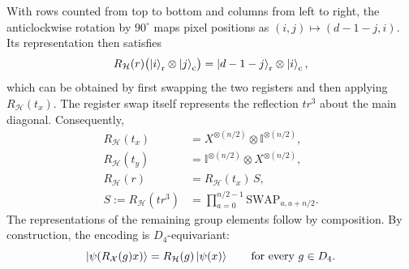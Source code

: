 \documentclass[aps,pra,reprint,superscriptaddress,longbibliography]{revtex4-2}
\begin{document}
With rows counted from top to bottom and columns from left to
right, the anticlockwise rotation by $90^\circ$ maps pixel positions
as $(i,j)\mapsto(d-1-j,i)$. Its representation then satisfies
\begin{equation}
R_{\mathcal H}(r)
\bigl(\ket{i}_{\mathrm r}\otimes\ket{j}_{\mathrm c}\bigr)
=\ket{d-1-j}_{\mathrm r}\otimes\ket{i}_{\mathrm c},
\end{equation}
which can be obtained by first swapping the two registers
and then applying $R_{\mathcal H}(t_x)$. The register swap itself
represents the reflection $tr^3$ about the main diagonal.
Consequently,
\begin{equation}
\begin{aligned}
R_{\mathcal H}(t_x)
&=X^{\otimes(n/2)}\otimes\mathbb I^{\otimes(n/2)},\\
R_{\mathcal H}(t_y)
&=\mathbb I^{\otimes(n/2)}\otimes X^{\otimes(n/2)},\\
R_{\mathcal H}(r)
&=R_{\mathcal H}(t_x)\,S,\\
S:=R_{\mathcal H}(tr^3)
&=\prod_{a=0}^{n/2-1}\mathrm{SWAP}_{a,a+n/2}.
\end{aligned}
\label{eq:representation}
\end{equation}
The representations of the remaining group elements follow by
composition. By construction, the encoding is $D_4$-equivariant:
\begin{equation}
\ket{\psi(R_{\mathcal X}(g)x)}
=R_{\mathcal H}(g)\ket{\psi(x)}
\qquad\text{for every }g\in D_4.
\end{equation}


\end{document}
